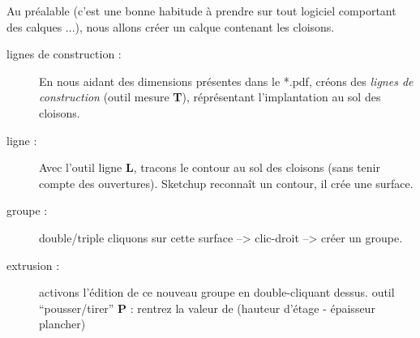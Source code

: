 \documentclass[a4paper,12pt,french]{sphinxmanual}
\begin{document}
Au préalable (c'est une bonne habitude à prendre sur tout logiciel comportant des calques ...), nous allons créer un calque contenant les cloisons.
\begin{description}
\item[{lignes de construction :}] \leavevmode
En nous aidant des dimensions présentes dans le *.pdf, créons des \emph{lignes de construction} (outil mesure \textbf{T}), réprésentant l'implantation au sol des cloisons.

\item[{ligne :}] \leavevmode
Avec l'outil ligne \textbf{L}, tracons le contour au sol des cloisons (sans tenir compte des ouvertures). Sketchup reconnaît un contour, il crée une surface.

\item[{groupe :}] \leavevmode
double/triple cliquons sur cette surface --\textgreater{} clic-droit --\textgreater{} créer un groupe.

\item[{extrusion :}] \leavevmode
activons l'édition de ce nouveau groupe en double-cliquant dessus.
outil ``pousser/tirer'' \textbf{P} : rentrez la valeur de  (hauteur d'étage - épaisseur plancher)

\end{description}
\end{document}
